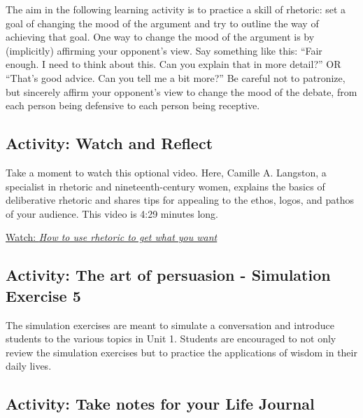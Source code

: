 \documentclass[
]{book}
\begin{document}
The aim in the following learning activity is to practice a skill of rhetoric: set a goal of changing the mood of the argument and try to outline the way of achieving that goal. One way to change the mood of the argument is by (implicitly) affirming your opponent's view. Say something like this: ``Fair enough. I need to think about this. Can you explain that in more detail?'' OR ``That's good advice. Can you tell me a bit more?'' Be careful not to patronize, but sincerely affirm your opponent's view to change the mood of the debate, from each person being defensive to each person being receptive.

\hypertarget{activity-watch-and-reflect-5}{%
\subsection*{Activity: Watch and Reflect}\label{activity-watch-and-reflect-5}}

\begin{reflect}
Take a moment to watch this optional video. Here, Camille A. Langston, a specialist in rhetoric and nineteenth-century women, explains the basics of deliberative rhetoric and shares tips for appealing to the ethos, logos, and pathos of your audience. This video is 4:29 minutes long.

\href{https://www.youtube.com/watch?v=3klMM9BkW5o}{Watch: \emph{How to use rhetoric to get what you want}}
\end{reflect}

\hypertarget{activity-the-art-of-persuasion---simulation-exercise-5}{%
\subsection*{Activity: The art of persuasion - Simulation Exercise 5}\label{activity-the-art-of-persuasion---simulation-exercise-5}}

\begin{reflect}
The simulation exercises are meant to simulate a conversation and introduce students to the various topics in Unit 1. Students are encouraged to not only review the simulation exercises but to practice the applications of wisdom in their daily lives.
\end{reflect}

\hypertarget{activity-take-notes-for-your-life-journal-5}{%
\subsection*{Activity: Take notes for your Life Journal}\label{activity-take-notes-for-your-life-journal-5}}
\end{document}
